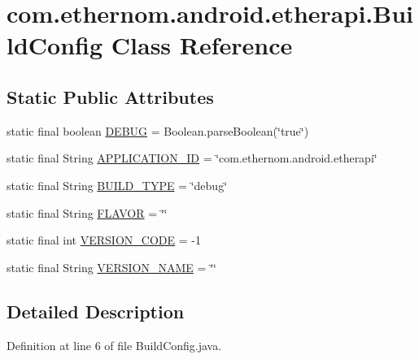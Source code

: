 \hypertarget{classcom_1_1ethernom_1_1android_1_1etherapi_1_1_build_config}{}\section{com.\+ethernom.\+android.\+etherapi.\+Build\+Config Class Reference}
\label{classcom_1_1ethernom_1_1android_1_1etherapi_1_1_build_config}
\subsection*{Static Public Attributes}
\begin{DoxyCompactItemize}
\item 
static final boolean \mbox{\hyperlink{classcom_1_1ethernom_1_1android_1_1etherapi_1_1_build_config_acc3611bce9027f49336b01c16575591d}{D\+E\+B\+UG}} = Boolean.\+parse\+Boolean(\char`\"{}true\char`\"{})
\item 
static final String \mbox{\hyperlink{classcom_1_1ethernom_1_1android_1_1etherapi_1_1_build_config_a4eddf2c386c2cc8fd88cf7ce67a58cd6}{A\+P\+P\+L\+I\+C\+A\+T\+I\+O\+N\+\_\+\+ID}} = \char`\"{}com.\+ethernom.\+android.\+etherapi\char`\"{}
\item 
static final String \mbox{\hyperlink{classcom_1_1ethernom_1_1android_1_1etherapi_1_1_build_config_ac2a5fa9f16dc66fda21b7b1b16b32649}{B\+U\+I\+L\+D\+\_\+\+T\+Y\+PE}} = \char`\"{}debug\char`\"{}
\item 
static final String \mbox{\hyperlink{classcom_1_1ethernom_1_1android_1_1etherapi_1_1_build_config_a359a4aa1ac852751b45e5cb610222c3b}{F\+L\+A\+V\+OR}} = \char`\"{}\char`\"{}
\item 
static final int \mbox{\hyperlink{classcom_1_1ethernom_1_1android_1_1etherapi_1_1_build_config_ae28c47a3b1f38a64e1c723ad52e967ef}{V\+E\+R\+S\+I\+O\+N\+\_\+\+C\+O\+DE}} = -\/1
\item 
static final String \mbox{\hyperlink{classcom_1_1ethernom_1_1android_1_1etherapi_1_1_build_config_aa4fe60e44ff95044227c168f962627d4}{V\+E\+R\+S\+I\+O\+N\+\_\+\+N\+A\+ME}} = \char`\"{}\char`\"{}
\end{DoxyCompactItemize}


\subsection{Detailed Description}


Definition at line 6 of file Build\+Config.\+java.



